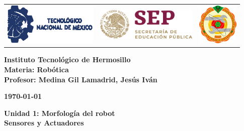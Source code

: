 \begin{titlepage}
	\centering
	\begin{tabular}{@{}p{} p{} p{}@{}}
		\includegraphics[height=2cm]{tecnm} & 
		\centering \includegraphics[height=1.5cm]{SEP} & 
		\raggedleft \includegraphics[height=2cm]{ith.jpg} \\
	\end{tabular}
	
	\vspace{2em}
	
	\noindent
	\begin{minipage}[t]{0.48\textwidth}
		\raggedright
		\small \textbf{%
			Instituto Tecnológico de Hermosillo\\
			Materia: Robótica\\
			Profesor: Medina Gil Lamadrid, Jesús Iván%
		}
	\end{minipage}%
	\hfill
	\begin{minipage}[t]{0.48\textwidth}
		\raggedleft
		\small \textbf{\today}
	\end{minipage}
	
	\vspace{2em}
	
	{\large \textbf{Unidad 1: Morfología del robot}}\\
	{\Huge \textbf{Sensores y Actuadores}}
		
	\vspace{1em}
	

\end{titlepage}
